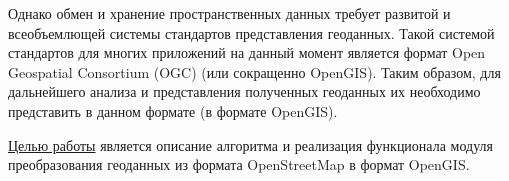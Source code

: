 \documentclass[12pt,a4paper,oneside]{article} %
\begin{document}
{Однако обмен и хранение пространственных данных требует развитой \linebreak
и всеобъемлющей системы стандартов представления геоданных. \linebreak
Такой системой стандартов для многих приложений на данный момент \linebreak
является формат Open Geospatial Consortium (OGC) (или сокращенно \linebreak
OpenGIS). Таким образом, для дальнейшего анализа и представления \linebreak
полученных геоданных их необходимо представить в данном формате \linebreak
(в формате OpenGIS).

\underline{Целью работы} является описание алгоритма и реализация \linebreak
функционала модуля преобразования геоданных из формата \linebreak
OpenStreetMap в формат OpenGIS.}
\end{document}
